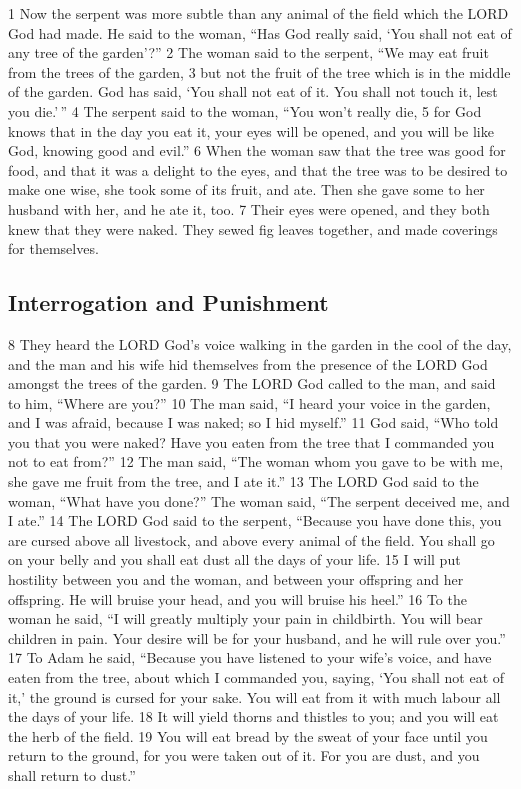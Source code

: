 {1} Now the serpent was more subtle than any animal of the field which
the LORD God had made. He said to the woman, ``Has God really said, `You
shall not eat of any tree of the garden'?'' {2} The woman said to the
serpent, ``We may eat fruit from the trees of the garden, {3} but not
the fruit of the tree which is in the middle of the garden. God has
said, `You shall not eat of it. You shall not touch it, lest you
die.'\,'' {4} The serpent said to the woman, ``You won't really die, {5}
for God knows that in the day you eat it, your eyes will be opened, and
you will be like God, knowing good and evil.'' {6} When the woman saw
that the tree was good for food, and that it was a delight to the eyes,
and that the tree was to be desired to make one wise, she took some of
its fruit, and ate. Then she gave some to her husband with her, and he
ate it, too. {7} Their eyes were opened, and they both knew that they
were naked. They sewed fig leaves together, and made coverings for
themselves.

\hypertarget{interrogation-and-punishment}{%
\subsection{Interrogation and
Punishment}\label{interrogation-and-punishment}}

{8} They heard the LORD God's voice walking in the garden in the cool of
the day, and the man and his wife hid themselves from the presence of
the LORD God amongst the trees of the garden. {9} The LORD God called to
the man, and said to him, ``Where are you?'' {10} The man said, ``I
heard your voice in the garden, and I was afraid, because I was naked;
so I hid myself.'' {11} God said, ``Who told you that you were naked?
Have you eaten from the tree that I commanded you not to eat from?''
{12} The man said, ``The woman whom you gave to be with me, she gave me
fruit from the tree, and I ate it.'' {13} The LORD God said to the
woman, ``What have you done?'' The woman said, ``The serpent deceived
me, and I ate.'' {14} The LORD God said to the serpent, ``Because you
have done this, you are cursed above all livestock, and above every
animal of the field. You shall go on your belly and you shall eat dust
all the days of your life. {15} I will put hostility between you and the
woman, and between your offspring and her offspring. He will bruise your
head, and you will bruise his heel.'' {16} To the woman he said, ``I
will greatly multiply your pain in childbirth. You will bear children in
pain. Your desire will be for your husband, and he will rule over you.''
{17} To Adam he said, ``Because you have listened to your wife's voice,
and have eaten from the tree, about which I commanded you, saying, `You
shall not eat of it,' the ground is cursed for your sake. You will eat
from it with much labour all the days of your life. {18} It will yield
thorns and thistles to you; and you will eat the herb of the field. {19}
You will eat bread by the sweat of your face until you return to the
ground, for you were taken out of it. For you are dust, and you shall
return to dust.''

